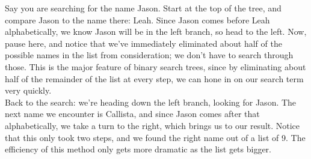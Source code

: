Say you are searching for the name Jason.  Start at the top of the tree, and compare Jason to the name there: Leah.  Since Jason comes before Leah alphabetically, we know Jason will be in the left branch, so head to the left.  Now, pause here, and notice that we've immediately eliminated about half of the possible names in the list from consideration; we don't have to search through those.  This is the major feature of binary search trees, since by eliminating about half of the remainder of the list at every step, we can hone in on our search term very quickly.\\

Back to the search: we're heading down the left branch, looking for Jason.  The next name we encounter is Callista, and since Jason comes after that alphabetically, we take a turn to the right, which brings us to our result.  Notice that this only took two steps, and we found the right name out of a list of 9.  The efficiency of this method only gets more dramatic as the list gets bigger.
\pagebreak

